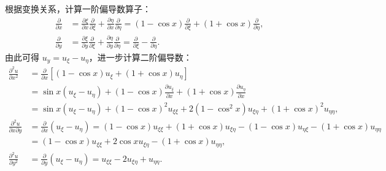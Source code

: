 \begin{myproof}
    根据变换关系，计算一阶偏导数算子：
    \begin{equation}
        \begin{aligned}
            \frac{\partial}{\partial x} & = \frac{\partial \xi}{\partial x} \frac{\partial}{\partial \xi} + \frac{\partial \eta}{\partial x} \frac{\partial}{\partial \eta} = (1 - \cos x) \frac{\partial}{\partial \xi} + (1 + \cos x) \frac{\partial}{\partial \eta}, \\
            \frac{\partial}{\partial y} & = \frac{\partial \xi}{\partial y} \frac{\partial}{\partial \xi} + \frac{\partial \eta}{\partial y} \frac{\partial}{\partial \eta} = \frac{\partial}{\partial \xi} - \frac{\partial}{\partial \eta}.
        \end{aligned}
    \end{equation}
    由此可得 $u_y = u_\xi - u_\eta$，进一步计算二阶偏导数：
    \begin{equation}
        \begin{aligned}
            \frac{\partial^2 u}{\partial x^2}          & = \frac{\partial}{\partial x} \left[ (1 - \cos x) u_\xi + (1 + \cos x) u_\eta \right]                                                                      \\
                                                       & = \sin x (u_\xi - u_\eta) + (1 - \cos x) \frac{\partial u_\xi}{\partial x} + (1 + \cos x) \frac{\partial u_\eta}{\partial x}                               \\
                                                       & = \sin x (u_\xi - u_\eta) + (1 - \cos x)^2 u_{\xi\xi} + 2(1 - \cos^2 x) u_{\xi\eta} + (1 + \cos x)^2 u_{\eta\eta},                                         \\
            \frac{\partial^2 u}{\partial x \partial y} & = \frac{\partial}{\partial x} (u_\xi - u_\eta) = (1 - \cos x) u_{\xi\xi} + (1 + \cos x) u_{\xi\eta} - (1 - \cos x) u_{\eta\xi} - (1 + \cos x) u_{\eta\eta} \\
                                                       & = (1 - \cos x) u_{\xi\xi} + 2\cos x u_{\xi\eta} - (1 + \cos x) u_{\eta\eta},                                                                               \\
            \frac{\partial^2 u}{\partial y^2}          & = \frac{\partial}{\partial y} (u_\xi - u_\eta) = u_{\xi\xi} - 2u_{\xi\eta} + u_{\eta\eta}.
        \end{aligned}
    \end{equation}

\end{myproof}
